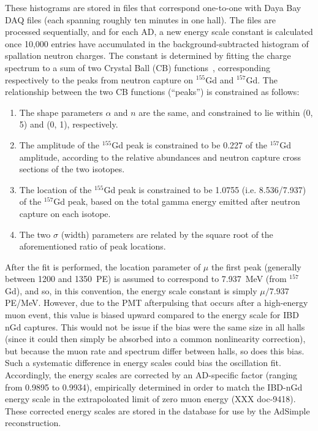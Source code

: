 \documentclass[../thesis.tex]{subfiles}
\begin{document}
\begin{comment}
  Note: For AdSimpleNL, in reconstruction, a (AD-specific?) scale constant is
  applied to the non-NL energy scale constant. See line 209 of
  QsumEnergyTool.cc. Discuss this?
\end{comment}

These histograms are stored in files that correspond one-to-one with Daya Bay
DAQ files (each spanning roughly ten minutes in one hall). The files are
processed sequentially, and for each AD, a new energy scale constant is
calculated once 10,000 entries have accumulated in the background-subtracted
histogram of spallation neutron charges. The constant is determined by fitting
the charge spectrum to a sum of two Crystal Ball (CB)
functions~\cite{cbfunction}, corresponding respectively to the peaks from
neutron capture on $^{155}$Gd and $^{157}$Gd. The relationship between the two
CB functions (``peaks'') is constrained as follows:

\begin{enumerate}
\item The shape parameters $\alpha$ and $n$ are the same, and constrained to lie
  within (0, 5) and (0, 1), respectively.
\item The amplitude of the $^{155}$Gd peak is constrained to be 0.227 of the
  $^{157}$Gd amplitude, according to the relative abundances and neutron capture
  cross sections of the two isotopes.
\item The location of the $^{155}$Gd peak is constrained to be 1.0755
  (i.e. 8.536/7.937) of the $^{157}$Gd peak, based on the total gamma energy
  emitted after neutron capture on each isotope.
\item The two $\sigma$ (width) parameters are related by the square root of the
  aforementioned ratio of peak locations.
\end{enumerate}

After the fit is performed, the location parameter of $\mu$ the first peak
(generally between 1200 and 1350~PE) is assumed to correspond to 7.937~MeV (from
$^{157}$Gd), and so, in this convention, the energy scale constant is simply
$\mu/7.937$ PE/MeV. However, due to the PMT afterpulsing that occurs after a
high-energy muon event, this value is biased upward compared to the energy scale
for IBD nGd captures. This would not be issue if the bias were the same size in
all halls (since it could then simply be absorbed into a common nonlinearity
correction), but because the muon rate and spectrum differ between halls, so
does this bias. Such a systematic difference in energy scales could bias the
oscillation fit. Accordingly, the energy scales are corrected by an AD-specific
factor (ranging from 0.9895 to 0.9934), empirically determined in order to match
the IBD-nGd energy scale in the extrapoloated limit of zero muon energy (XXX
doc-9418). These corrected energy scales are stored in the database for use by
the AdSimple reconstruction.
\end{document}
